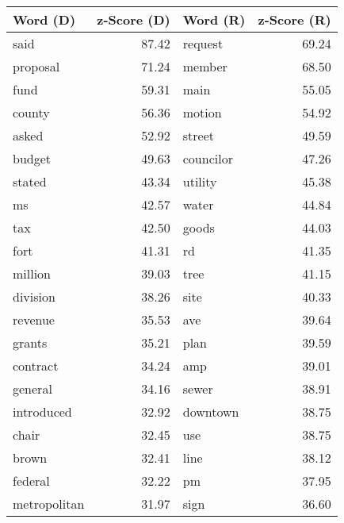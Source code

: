 \begin{table}[ht]
\centering
\begingroup\fontsize{9pt}{10pt}\selectfont
\begin{tabular}{lrlr}
  \hline
Word (D) & z-Score (D) & Word (R) & z-Score (R) \\ 
  \hline
said & 87.42 & request & 69.24 \\ 
  proposal & 71.24 & member & 68.50 \\ 
  fund & 59.31 & main & 55.05 \\ 
  county & 56.36 & motion & 54.92 \\ 
  asked & 52.92 & street & 49.59 \\ 
  budget & 49.63 & councilor & 47.26 \\ 
  stated & 43.34 & utility & 45.38 \\ 
  ms & 42.57 & water & 44.84 \\ 
  tax & 42.50 & goods & 44.03 \\ 
  fort & 41.31 & rd & 41.35 \\ 
  million & 39.03 & tree & 41.15 \\ 
  division & 38.26 & site & 40.33 \\ 
  revenue & 35.53 & ave & 39.64 \\ 
  grants & 35.21 & plan & 39.59 \\ 
  contract & 34.24 & amp & 39.01 \\ 
  general & 34.16 & sewer & 38.91 \\ 
  introduced & 32.92 & downtown & 38.75 \\ 
  chair & 32.45 & use & 38.75 \\ 
  brown & 32.41 & line & 38.12 \\ 
  federal & 32.22 & pm & 37.95 \\ 
  metropolitan & 31.97 & sign & 36.60 \\ 
  \hline
\end{tabular}
\endgroup
\label{tabFightinIN}
\end{table}


